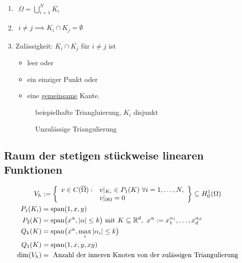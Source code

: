 \begin{enumerate}[label=(\roman*)]
\item $\begin{aligned}
\overline{\Omega}=\bigcup\limits_{i=1}^N \overline{K_i}
\end{aligned}$ 

\item $\begin{aligned}
i\neq j\implies K_i\cap K_j=\emptyset
\end{aligned}$
\item Zulässigkeit: $\overline{K_i}\cap\overline{K_j}$ für $i\neq j$ ist
\begin{itemize}
\item leer oder
\item ein einziger Punkt oder
\item eine \ul{gemeinsame} Kante.
\end{itemize}

\begin{figure}[h!]
\begin{center}

\caption{beispielhafte Triangluierung, $K_i$ disjunkt}
\label{AbbTriangulierung}
\end{center}
\end{figure}


\begin{figure}[h!]
\begin{center}

\caption{Unzulässige Triangulierung}
\label{AbbUnzulaessigeTriangulierung}
\end{center}
\end{figure}
\end{enumerate}

\subsection*{Raum der stetigen stückweise linearen Funktionen}
\begin{align*}
V_h&:=\left\lbrace
\begin{array}{rl}
	v\in C(\overline{\Omega}) : &v|_{K_i}\in P_1(K)~\forall i=1,\ldots,N,\\
	&v|_{\partial\Omega}=0
\end{array}\right\rbrace
	\subseteq H^1_0(\Omega)\\
P_1(K_i)&=\text{span}(1,x,y)\\
P_2(K)&=\text{span}\big( x^\alpha, |\alpha|\leq k\big)\text{ mit } K\subseteq\mathbb{R}^d,~ x^{\alpha}:=x_1^{\alpha_1},\ldots,x_d^{\alpha_d}\\
Q_k(K)&=\text{span}\big(x^\alpha,\max\limits_i |\alpha_i|\leq k\big)\\
Q_1(K)&=\text{span}(1,x,y,xy)\\
\dim(V_h)&=\text{ Anzahl der inneren Knoten von der zulässigen Triangulierung}\\
\end{align*}

